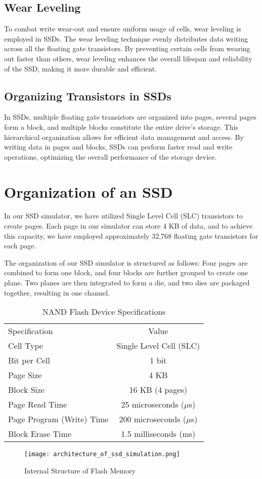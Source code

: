 \documentclass[conference]{IEEEtran}
\begin{document}
\subsection{Wear Leveling}
To combat write wear-out and ensure uniform usage of cells, wear leveling is employed in SSDs. The wear leveling technique evenly distributes data writing across all the floating gate transistors. By preventing certain cells from wearing out faster than others, wear leveling enhances the overall lifespan and reliability of the SSD, making it more durable and efficient.

\subsection{Organizing Transistors in SSDs}
In SSDs, multiple floating gate transistors are organized into pages, several pages form a block, and multiple blocks constitute the entire drive's storage. This hierarchical organization allows for efficient data management and access. By writing data in pages and blocks, SSDs can perform faster read and write operations, optimizing the overall performance of the storage device.


\section{Organization of an SSD}
In our SSD simulator, we have utilized Single Level Cell (SLC) transistors to create pages. Each page in our simulator can store 4 KB of data, and to achieve this capacity, we have employed approximately 32,768 floating gate transistors for each page.

The organization of our SSD simulator is structured as follows: Four pages are combined to form one block, and four blocks are further grouped to create one plane. Two planes are then integrated to form a die, and two dies are packaged together, resulting in one channel.

\begin{table}[htbp]
    \centering
    \caption{NAND Flash Device Specifications}
    \begin{tabular}{l c}
        Specification & Value \\
        Cell Type & Single Level Cell (SLC) \\
        Bit per Cell & 1 bit \\
        Page Size & 4 KB \\
        Block Size & 16 KB (4 pages) \\
        Page Read Time & 25 microseconds ($\mu$s) \\
        Page Program (Write) Time & 200 microseconds ($\mu$s) \\
        Block Erase Time & 1.5 milliseconds (ms) \\
    \end{tabular}
\end{table}
\begin{figure}[h]
    \centering
    \texttt{[image: architecture\_of\_ssd\_simulation.png]}
    \caption{Internal Structure of Flash Memory}
    \label{fig:architecture_of_ssd_simulation}
\end{figure}
\end{document}
